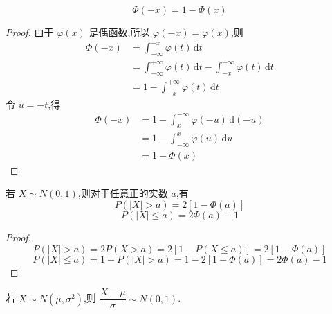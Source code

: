 \begin{property}
    \begin{equation} \label{equation:Phi(-x)}
        \varPhi(-x) = 1-\varPhi(x)
    \end{equation}
\end{property}

\begin{proof}
    由于 $\varphi(x)$ 是偶函数,所以 $\varphi(-x)=\varphi(x)$,则
    $$
    \begin{aligned}
        \varPhi(-x) &= \int_{-\infty}^{-x} \varphi(t) \,\text{d}t \\
        &= \int_{-\infty}^{+\infty} \varphi(t) \,\text{d}t - \int_{-x}^{+\infty} \varphi(t) \,\text{d}t \\
        &= 1 - \int_{-x}^{+\infty} \varphi(t) \,\text{d}t
    \end{aligned}
    $$
    令 $u=-t$,得
    $$
    \begin{aligned}
        \varPhi(-x) &= 1 - \int_{x}^{-\infty} \varphi(-u) \,\text{d}(-u) \\
        &= 1 - \int_{-\infty}^{x} \varphi(u) \,\text{d}u \\
        &= 1-\varPhi(x)
    \end{aligned}
    $$
\end{proof}

\begin{property}
    \indent 若 $X \sim N(0,1)$,则对于任意正的实数 $a$,有
    \begin{equation} \label{equation:P(X>a)}
        P(|X|>a) = 2[1 - \varPhi(a)]
    \end{equation}
    \begin{equation} \label{equation:P(X<=a)}
        P(|X| \leqslant a) = 2 \varPhi(a) - 1
    \end{equation}
\end{property}

\begin{proof}
    $$
    P(|X|>a) = 2 P(X>a) = 2[1 - P(X \leqslant a)] = 2[1-\varPhi(a)]
    $$
    $$
    P(|X| \leqslant a) = 1 - P(|X|>a) = 1-2[1-\varPhi(a)] = 2\varPhi(a)-1
    $$

    \vspace{-2em}
\end{proof}

\begin{property}
    \indent 若 $X \sim N(\mu,\sigma^2)$,则 $\dfrac{X - \mu}{\sigma} \sim N(0,1)$.
\end{property}

